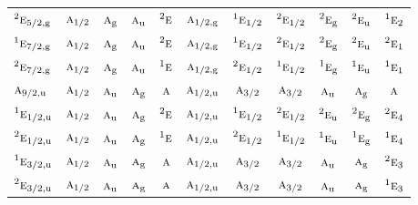 \documentclass[10pt,a4paper]{article}
\numberwithin{equation}{section}
\newcommand{\irr}[1]{\text{\normalfont\scshape #1}}
\newcommand{\conjpair}[1]{{}^{#1}}
\newcommand{\ptag}[1]{\mathrm{#1}}
\begin{document}
{\begin{longtable}{@{}lcccccccccc@{}}
$\conjpair{2}\irr{e}_{5/2,\ptag{g}}$ & $\irr{a}_{1/2}$ & $\irr{a}_{\ptag{g}}$ & $\irr{a}_{\ptag{u}}$ & $\conjpair{2}\irr{e}$ & $\irr{a}_{1/2,\ptag{g}}$ & $\conjpair{1}\irr{e}_{1/2}$ & $\conjpair{2}\irr{e}_{1/2}$ & $\conjpair{2}\irr{e}_{\ptag{g}}$ & $\conjpair{2}\irr{e}_{\ptag{u}}$ & $\conjpair{1}\irr{e}_{2}$\\
$\conjpair{1}\irr{e}_{7/2,\ptag{g}}$ & $\irr{a}_{1/2}$ & $\irr{a}_{\ptag{g}}$ & $\irr{a}_{\ptag{u}}$ & $\conjpair{2}\irr{e}$ & $\irr{a}_{1/2,\ptag{g}}$ & $\conjpair{1}\irr{e}_{1/2}$ & $\conjpair{2}\irr{e}_{1/2}$ & $\conjpair{2}\irr{e}_{\ptag{g}}$ & $\conjpair{2}\irr{e}_{\ptag{u}}$ & $\conjpair{2}\irr{e}_{1}$\\
$\conjpair{2}\irr{e}_{7/2,\ptag{g}}$ & $\irr{a}_{1/2}$ & $\irr{a}_{\ptag{g}}$ & $\irr{a}_{\ptag{u}}$ & $\conjpair{1}\irr{e}$ & $\irr{a}_{1/2,\ptag{g}}$ & $\conjpair{2}\irr{e}_{1/2}$ & $\conjpair{1}\irr{e}_{1/2}$ & $\conjpair{1}\irr{e}_{\ptag{g}}$ & $\conjpair{1}\irr{e}_{\ptag{u}}$ & $\conjpair{1}\irr{e}_{1}$\\
$\irr{a}_{9/2,\ptag{u}}$ & $\irr{a}_{1/2}$ & $\irr{a}_{\ptag{u}}$ & $\irr{a}_{\ptag{g}}$ & $\irr{a}$ & $\irr{a}_{1/2,\ptag{u}}$ & $\irr{a}_{3/2}$ & $\irr{a}_{3/2}$ & $\irr{a}_{\ptag{u}}$ & $\irr{a}_{\ptag{g}}$ & $\irr{a}$\\
$\conjpair{1}\irr{e}_{1/2,\ptag{u}}$ & $\irr{a}_{1/2}$ & $\irr{a}_{\ptag{u}}$ & $\irr{a}_{\ptag{g}}$ & $\conjpair{2}\irr{e}$ & $\irr{a}_{1/2,\ptag{u}}$ & $\conjpair{1}\irr{e}_{1/2}$ & $\conjpair{2}\irr{e}_{1/2}$ & $\conjpair{2}\irr{e}_{\ptag{u}}$ & $\conjpair{2}\irr{e}_{\ptag{g}}$ & $\conjpair{2}\irr{e}_{4}$\\
$\conjpair{2}\irr{e}_{1/2,\ptag{u}}$ & $\irr{a}_{1/2}$ & $\irr{a}_{\ptag{u}}$ & $\irr{a}_{\ptag{g}}$ & $\conjpair{1}\irr{e}$ & $\irr{a}_{1/2,\ptag{u}}$ & $\conjpair{2}\irr{e}_{1/2}$ & $\conjpair{1}\irr{e}_{1/2}$ & $\conjpair{1}\irr{e}_{\ptag{u}}$ & $\conjpair{1}\irr{e}_{\ptag{g}}$ & $\conjpair{1}\irr{e}_{4}$\\
$\conjpair{1}\irr{e}_{3/2,\ptag{u}}$ & $\irr{a}_{1/2}$ & $\irr{a}_{\ptag{u}}$ & $\irr{a}_{\ptag{g}}$ & $\irr{a}$ & $\irr{a}_{1/2,\ptag{u}}$ & $\irr{a}_{3/2}$ & $\irr{a}_{3/2}$ & $\irr{a}_{\ptag{u}}$ & $\irr{a}_{\ptag{g}}$ & $\conjpair{2}\irr{e}_{3}$\\
$\conjpair{2}\irr{e}_{3/2,\ptag{u}}$ & $\irr{a}_{1/2}$ & $\irr{a}_{\ptag{u}}$ & $\irr{a}_{\ptag{g}}$ & $\irr{a}$ & $\irr{a}_{1/2,\ptag{u}}$ & $\irr{a}_{3/2}$ & $\irr{a}_{3/2}$ & $\irr{a}_{\ptag{u}}$ & $\irr{a}_{\ptag{g}}$ & $\conjpair{1}\irr{e}_{3}$\\

\end{longtable}}
\end{document}
